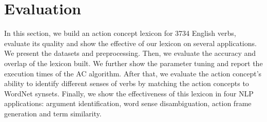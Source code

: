\section{Evaluation}
\label{sec:eval}

In this section, we build an action concept lexicon for 3734 English
verbs, evaluate its quality and show the effective of
our lexicon on several applications.
We present the datasets and preprocessing.
Then, we evaluate the accuracy and overlap of the lexicon built.
We further show the parameter tuning
and report the execution times of the AC algorithm.
After that, we evaluate the action concept's ability to
identify different senses of verbs by matching
the action concepts to WordNet synsets.
Finally, we show the effectiveness of this lexicon in
four NLP applications:
argument identification, word sense disambiguation,
action frame generation and term similarity.











